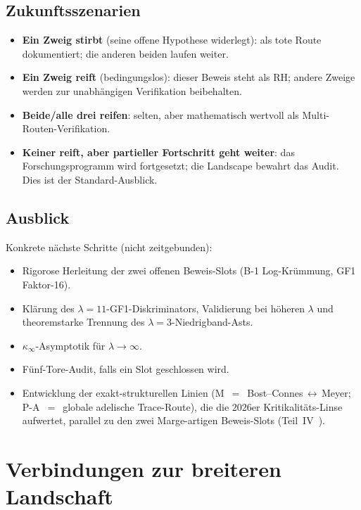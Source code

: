 \documentclass[12pt,a4paper]{article}
\theoremstyle{definition}
\theoremstyle{remark}
\begin{document}
\subsection{Zukunftsszenarien}

\begin{itemize}
  \item \textbf{Ein Zweig stirbt} (seine offene Hypothese widerlegt):
    als tote Route dokumentiert; die anderen beiden laufen weiter.
  \item \textbf{Ein Zweig reift} (bedingungslos): dieser Beweis steht
    als RH; andere Zweige werden zur unabhängigen Verifikation beibehalten.
  \item \textbf{Beide/alle drei reifen}: selten, aber mathematisch
    wertvoll als Multi-Routen-Verifikation.
  \item \textbf{Keiner reift, aber partieller Fortschritt geht weiter}:
    das Forschungsprogramm wird fortgesetzt; die Landscape bewahrt das
    Audit. Dies ist der Standard-Ausblick.
\end{itemize}


\subsection{Ausblick}

Konkrete nächste Schritte (nicht zeitgebunden):
\begin{itemize}
  \item Rigorose Herleitung der zwei offenen Beweis-Slots (B-1
    Log-Krümmung, GF1 Faktor-16).
  \item Klärung des $\lambda=11$-GF1-Diskriminators, Validierung bei
    höheren $\lambda$ und theoremstarke Trennung des
    $\lambda=3$-Niedrigband-Asts.
  \item $\kappa_\infty$-Asymptotik für $\lambda \to \infty$.
  \item Fünf-Tore-Audit, falls ein Slot geschlossen wird.
  \item Entwicklung der exakt-strukturellen Linien (M~$=$~Bost--Connes\,$\leftrightarrow$\,Meyer;
    P-A~$=$~globale adelische Trace-Route), die die 2026er Kritikalitäts-Linse
    aufwertet, parallel zu den zwei Marge-artigen Beweis-Slots
    (Teil~IV~\cite{Geiger2026partIV}).
\end{itemize}


\section{Verbindungen zur breiteren Landschaft}
\label{sec:connections}
\end{document}

